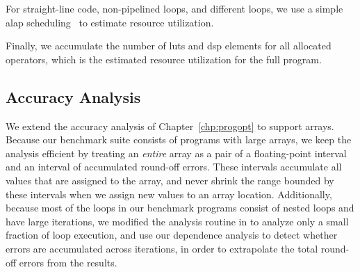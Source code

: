 For straight-line code, non-pipelined loops, and different loops, we use a
simple \gls{alap} scheduling~\cite{wang_hls} to estimate resource utilization.

Finally, we accumulate the number of \glspl{lut} and \gls{dsp} elements for all
allocated operators, which is the estimated resource utilization for the full
program.


\subsection{Accuracy Analysis}
\label{lo:sub:accuracy_analysis}

We extend the accuracy analysis of Chapter~\ref{chp:progopt} to support
arrays. Because our benchmark suite consists of programs with large arrays,
we keep the analysis efficient by treating an \emph{entire} array as a pair
of a floating-point interval and an interval of accumulated round-off errors.
These intervals accumulate all values that are assigned to the array, and
never shrink the range bounded by these intervals when we assign new values to
an array location.  Additionally, because most of the loops in our benchmark
programs consist of nested loops and have large iterations, we modified the
analysis routine in \soap{} to analyze only a small fraction of loop execution,
and use our dependence analysis to detect whether errors are accumulated
across iterations, in order to extrapolate the total round-off errors from the
results.


